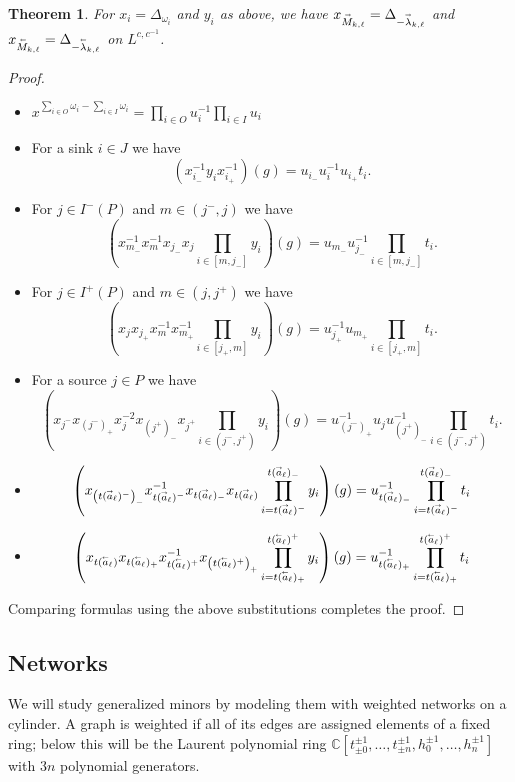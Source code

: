 \documentclass[12pt]{amsart}
\newcommand{\CC}{\mathbb{C}}
\renewcommand{\vec}[1]{\accentset{\shortrightarrow}{#1}}
\newcommand{\cev}[1]{\accentset{\shortleftarrow}{#1}}
\newtheorem{theorem}{Theorem}[section]
\numberwithin{equation}{section}
\begin{document}
  \begin{theorem}
    For $x_i=\Delta_{\omega_i}$ and $y_i$ as above, we have $x_{\vec{M}_{k,\ell}}=\Delta_{-\vec{\lambda}_{k,\ell}}$ and $x_{\cev{M}_{k,\ell}}=\Delta_{-\cev{\lambda}_{k,\ell}}$ on $L^{c,c^{-1}}$.
  \end{theorem}
  \begin{proof}\mbox{}
    \begin{itemize}
      \item $x^{\sum_{i\in O}\omega_i-\sum_{i\in I}\omega_i}=\prod\limits_{i\in O}u_i^{-1}\prod\limits_{i\in I}u_i$
      \item For a sink $i\in J$ we have
      \[\left(x_{i_-}^{-1}y_ix_{i_+}^{-1}\right)(g)=u_{i_-}u_i^{-1}u_{i_+}t_i.\]
      \item For $j\in I^-(P)$ and $m\in(j^-,j)$ we have
      \[\left(x_{m_-}^{-1}x_m^{-1}x_{j_-}x_j\prod\limits_{i\in[m,j_-]}y_i\right)(g)=u_{m_-}u_{j_-}^{-1}\prod\limits_{i\in[m,j_-]}t_i.\]
      \item For $j\in I^+(P)$ and $m\in(j,j^+)$ we have
      \[\left(x_jx_{j_+}x_m^{-1}x_{m_+}^{-1}\prod\limits_{i\in[j_+,m]}y_i\right)(g)=u_{j_+}^{-1}u_{m_+}\prod\limits_{i\in[j_+,m]}t_i.\]
      \item For a source $j\in P$ we have
      \[\left(x_{j^-}x_{(j^-)_+}x_j^{-2}x_{(j^+)_-}x_{j^+}\prod\limits_{i\in(j^-,j^+)}y_i\right)(g)=u_{(j^-)_+}^{-1}u_ju_{(j^+)_-}^{-1}\prod\limits_{i\in(j^-,j^+)}t_i.\]
      \item 
      \[\left(x_{\left(t(\vec{a}_\ell)^-\right)_-}x_{t(\vec{a}_\ell)^-}^{-1}x_{t(\vec{a}_\ell)_-}x_{t(\vec{a}_\ell)}\prod_{i=t(\vec{a}_\ell)^-}^{t(\vec{a}_\ell)_-}y_i\right)(g)=u_{t(\vec{a}_\ell)_-}^{-1}\prod_{i=t(\vec{a}_\ell)^-}^{t(\vec{a}_\ell)_-}t_i\]
      \item
      \[\left(x_{t(\cev{a}_\ell)}x_{t(\cev{a}_\ell)_+}x_{t(\cev{a}_\ell)^+}^{-1}x_{\left(t(\cev{a}_\ell)^+\right)_+}\prod_{i=t(\cev{a}_\ell)_+}^{t(\cev{a}_\ell)^+}y_i\right)(g)=u_{t(\cev{a}_\ell)_+}^{-1}\prod_{i=t(\cev{a}_\ell)_+}^{t(\cev{a}_\ell)^+}t_i\]
    \end{itemize}
    Comparing formulas using the above substitutions completes the proof.
  \end{proof}

\subsection{Networks}

We will study generalized minors by modeling them with weighted networks on a cylinder. A graph is weighted if all of its edges are assigned elements of a fixed ring; below this will be the Laurent polynomial ring $\CC[t_{\pm0}^{\pm1},\dotsc,t_{\pm n}^{\pm1},h_0^{\pm1},\dotsc,h_n^{\pm1}]$ with $3n$ polynomial generators.
\end{document}
